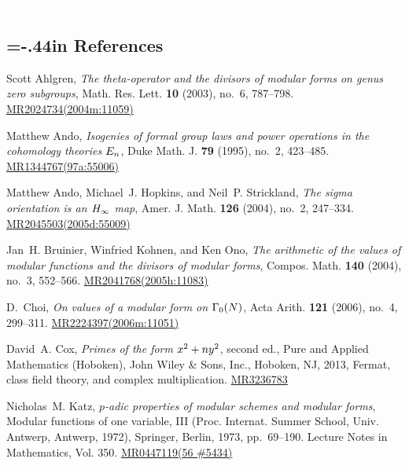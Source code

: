 \documentclass{gtpart}
\theoremstyle{definition}
\theoremstyle{remark}
\renewcommand{\=}{\approx}
\renewcommand{\-}{\sim}
\newcommand{\wt}[1]{\textcolor{white}{#1} \!~}
\numberwithin{equation}{section}
\begin{document}
\renewcommand\refname{}
\newcommand{\AX}[1]{\href{http://arxiv.org/abs/#1}{arXiv:#1}}
\newcommand{\MRn}[2]{\href{http://www.ams.org/mathscinet-getitem?mr=#1}{MR#1#2}}
\newcommand{\name}{TateNormalLevelResolutions.pdf}
\wt{.}\vspace{-.5in}
\begin{thebibliography}

\section*{\leftskip=-.44in References \vspace{.17in}}

Scott Ahlgren, \emph{The theta-operator and the divisors of modular forms on
  genus zero subgroups}, Math. Res. Lett. \textbf{10} (2003), no.~6,
  787--798. \MRn{2024734}{(2004m:11059)}

Matthew Ando, \emph{Isogenies of formal group laws and power operations in the
  cohomology theories {$E\sb n$}}, Duke Math. J. \textbf{79} (1995), no.~2,
  423--485. \MRn{1344767}{(97a:55006)}

Matthew Ando, Michael~J. Hopkins, and Neil~P. Strickland, \emph{The sigma
  orientation is an {$H\sb \infty$} map}, Amer. J. Math. \textbf{126} (2004),
  no.~2, 247--334. \MRn{2045503}{(2005d:55009)}

Jan~H. Bruinier, Winfried Kohnen, and Ken Ono, \emph{The arithmetic of the
  values of modular functions and the divisors of modular forms}, Compos. Math.
  \textbf{140} (2004), no.~3, 552--566. \MRn{2041768}{(2005h:11083)}

D.~Choi, \emph{On values of a modular form on {$\Gamma\sb 0(N)$}}, Acta Arith.
  \textbf{121} (2006), no.~4, 299--311. \MRn{2224397}{(2006m:11051)}

David~A. Cox, \emph{Primes of the form {$x\sp 2 + ny\sp 2$}}, second ed., Pure
  and Applied Mathematics (Hoboken), John Wiley \& Sons, Inc., Hoboken, NJ,
  2013, Fermat, class field theory, and complex multiplication. \MRn{3236783}{}

Nicholas~M. Katz, \emph{{$p$}-adic properties of modular schemes and modular
  forms}, Modular functions of one variable, {III} ({P}roc. {I}nternat.
  {S}ummer {S}chool, {U}niv. {A}ntwerp, {A}ntwerp, 1972), Springer, Berlin,
  1973, pp.~69--190. Lecture Notes in Mathematics, Vol. 350. \MRn{0447119}{(56
  \#5434)}


\end{thebibliography}
\end{document}
